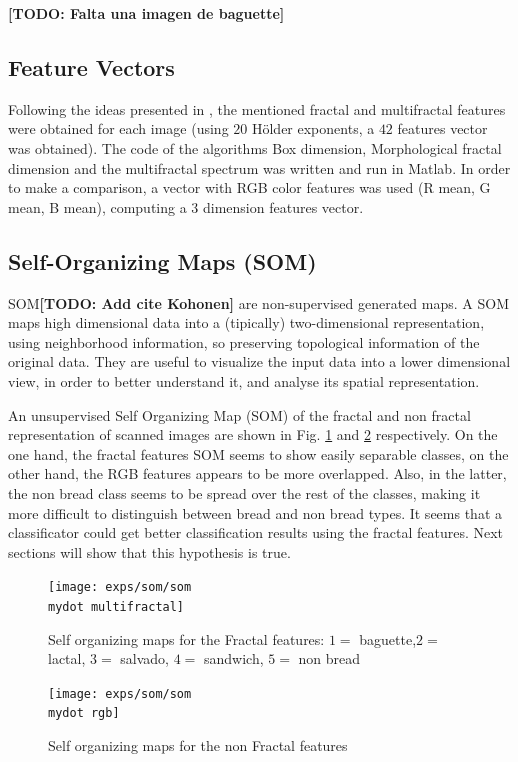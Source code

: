 \documentclass[oneside,a4paper,english,links]{amca}
\newcommand{\mydot}{.}
\newcommand{\todo}[1]{\textbf{[TODO: #1]}}
\begin{document}
\todo{Falta una imagen de baguette}

\subsection{Feature Vectors}


Following the ideas presented in \cite{Gonzales2008}, the mentioned fractal and multifractal features were obtained for each image (using $20$ H\"older exponents, a $42$ features vector was obtained). The code of the algorithms Box dimension, Morphological fractal dimension and the multifractal spectrum was written and run in Matlab. In order to make a comparison, a vector with RGB color features was used (R mean, G mean, B mean), computing a $3$ dimension features vector.

\subsection{Self-Organizing Maps (SOM)}
SOM\todo{ Add cite Kohonen} are non-supervised generated maps. A SOM maps high dimensional data into a (tipically) two-dimensional representation, using neighborhood information, so preserving topological information of the original data. They are useful to visualize the input data into a lower dimensional view, in order to better understand it, and analyse its spatial representation.

An unsupervised Self Organizing Map (SOM) of the fractal and non fractal representation of scanned images are shown in Fig. \ref{fig:somfractal} and \ref{fig:somrgb} respectively. On the one hand, the fractal features SOM seems to show easily separable classes, on the other hand, the RGB features appears to be more overlapped. Also, in the latter, the non bread class seems to be spread over the rest of the classes, making it more difficult to distinguish between bread and non bread types. It seems that a classificator could get better classification results using the fractal features. Next sections will show that this hypothesis is true.

\begin{figure}[]
\centering
\texttt{[image: exps/som/som\\mydot multifractal]}
\caption{Self organizing maps for the Fractal features: $1 =$ baguette,$2 =$ lactal, $3 =$ salvado, $4 =$ sandwich, $5 =$ non bread }
\label{fig:somfractal}
\end{figure}

\begin{figure}[]
\centering
\texttt{[image: exps/som/som\\mydot rgb]}
\caption{Self organizing maps for the non Fractal features}
\label{fig:somrgb}
\end{figure}
\end{document}
